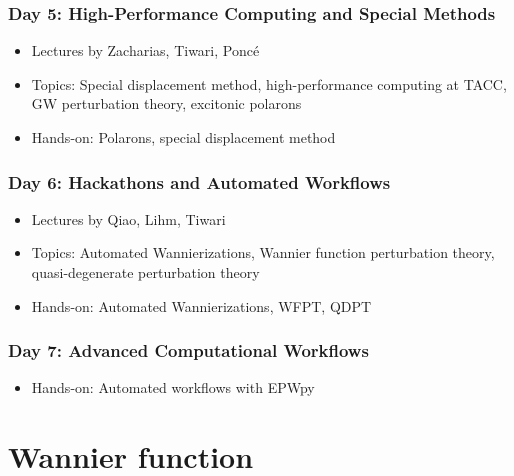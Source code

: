 \documentclass{CustomBeamer}
\begin{document}
    \begin{frame}
    \frametitle{Day 5: High-Performance Computing and Special Methods}
    \begin{itemize}
        \item Lectures by Zacharias, Tiwari, Poncé
        \item Topics: Special displacement method, high-performance computing at TACC, GW perturbation theory, excitonic polarons
        \item Hands-on: Polarons, special displacement method
    \end{itemize}
    \end{frame}
    
    \begin{frame}
    \frametitle{Day 6: Hackathons and Automated Workflows}
    \begin{itemize}
        \item Lectures by Qiao, Lihm, Tiwari
        \item Topics: Automated Wannierizations, Wannier function perturbation theory, quasi-degenerate perturbation theory
        \item Hands-on: Automated Wannierizations, WFPT, QDPT
    \end{itemize}
    \end{frame}
    
    \begin{frame}
    \frametitle{Day 7: Advanced Computational Workflows}
    \begin{itemize}
        \item Hands-on: Automated workflows with EPWpy
    \end{itemize}
    \end{frame}
  \fi  
 
\section{Wannier function}
    
\end{document}
